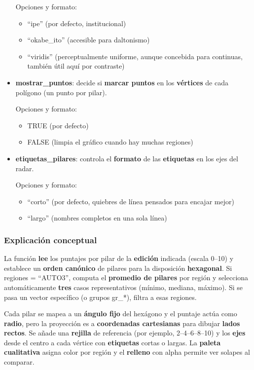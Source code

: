 \documentclass[
  11pt,
  letterpaper,
  DIV=11,
  numbers=noendperiod]{scrartcl}
\begin{document}
\begin{itemize}
  Opciones y formato:

  \begin{itemize}
  \item
    ``ipe'' (por defecto, institucional)
  \item
    ``okabe\_ito'' (accesible para daltonismo)
  \item
    ``viridis'' (perceptualmente uniforme, aunque concebida para
    continuas, también útil aquí por contraste)
  \end{itemize}
\item
  \textbf{mostrar\_puntos}: decide si \textbf{marcar puntos} en los
  \textbf{vértices} de cada polígono (un punto por pilar).

  Opciones y formato:

  \begin{itemize}
  \item
    TRUE (por defecto)
  \item
    FALSE (limpia el gráfico cuando hay muchas regiones)
  \end{itemize}
\item
  \textbf{etiquetas\_pilares}: controla el \textbf{formato} de las
  \textbf{etiquetas} en los ejes del radar.

  Opciones y formato:

  \begin{itemize}
  \item
    ``corto'' (por defecto, quiebres de línea pensados para encajar
    mejor)
  \item
    ``largo'' (nombres completos en una sola línea)
  \end{itemize}
\end{itemize}

\subsubsection{\texorpdfstring{\textbf{Explicación
conceptual}}{Explicación conceptual}}\label{explicaciuxf3n-conceptual-8}

La función \textbf{lee} los puntajes por pilar de la \textbf{edición}
indicada (escala 0--10) y establece un \textbf{orden canónico} de
pilares para la disposición \textbf{hexagonal}. Si regiones = ``AUTO3'',
computa el \textbf{promedio de pilares} por región y selecciona
automáticamente \textbf{tres} casos representativos (mínimo, mediana,
máximo). Si se pasa un vector específico (o grupos gr\_*), filtra a esas
regiones.

Cada pilar se mapea a un \textbf{ángulo fijo} del hexágono y el puntaje
actúa como \textbf{radio}, pero la proyección es a \textbf{coordenadas
cartesianas} para dibujar \textbf{lados rectos}. Se añade una
\textbf{rejilla} de referencia (por ejemplo, 2--4--6--8--10) y los
\textbf{ejes} desde el centro a cada vértice con \textbf{etiquetas}
cortas o largas. La \textbf{paleta cualitativa} asigna color por región
y el \textbf{relleno} con alpha permite ver solapes al comparar.
\end{document}
